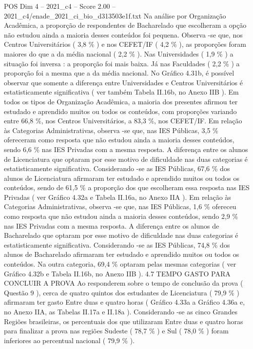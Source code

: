 \begin{textsample}{POS Dim 4 – 2021\_c4 – Score 2.00 – 2021\_c4/enade\_2021\_ci\_bio\_d313503e1f.txt}
Na análise por Organização Acadêmica, a proporção de respondentes de Bacharelado que escolheram a opção não estudou ainda a maioria desses conteúdos foi pequena.
Observa -se que, nos Centros Universitários ( 3,8 \% ) e nos CEFET/IF ( 4,2 \% ), as proporções foram maiores do que a da média nacional ( 2,2 \% ).
Nas Universidades ( 1,9 \% ) a situação foi inversa : a proporção foi mais baixa.
Já nas Faculdades ( 2,2 \% ) a proporção foi a mesma que a da média nacional.
No Gráfico 4.31b, é possível observar que somente a diferença entre Universidades e Centros Universitários é estatisticamente significativa ( ver também Tabela II.16b, no Anexo IIB ).
Em todos os tipos de Organização Acadêmica, a maioria dos presentes afirmou ter estudado e aprendido muitos ou todos os conteúdos, com proporções variando entre 66,8 \%, nos Centros Universitários, a 83,3 \%, nos CEFET/IF.
Em relação às Categorias Administrativas, observa -se que, nas IES Públicas, 3,5 \% ofereceram como resposta que não estudou ainda a maioria desses conteúdos, sendo 6,6 \% nas IES Privadas com a mesma resposta.
A diferença entre os alunos de Licenciatura que optaram por esse motivo de dificuldade nas duas categorias é estatisticamente significativa.
Considerando -se as IES Públicas, 67,6 \% dos alunos de Licenciatura afirmaram ter estudado e aprendido muitos ou todos os conteúdos, sendo de 61,5 \% a proporção dos que escolheram essa resposta nas IES Privadas ( ver Gráfico 4.32a e Tabela II.16a, no Anexo IIA ).
Em relação às Categorias Administrativas, observa -se que, nas IES Públicas, 1,6 \% ofereceu como resposta que não estudou ainda a maioria desses conteúdos, sendo 2,9 \% nas IES Privadas com a mesma resposta.
A diferença entre os alunos de Bacharelado que optaram por esse motivo de dificuldade nas duas categorias é estatisticamente significativa.
Considerando -se as IES Públicas, 74,8 \% dos alunos de Bacharelado afirmaram ter estudado e aprendido muitos ou todos os conteúdos.
Na outra categoria, 69,4 \% optaram pelas mesmas categorias ( ver Gráfico 4.32b e Tabela II.16b, no Anexo IIB ). 4.7 TEMPO GASTO PARA CONCLUIR A PROVA Ao responderem sobre o tempo de conclusão da prova ( Questão 9 ), cerca de quatro quintos dos estudantes de Licenciatura ( 79,9 \% ) afirmaram ter gasto Entre duas e quatro horas ( Gráfico 4.33a a Gráfico 4.36a e, no Anexo IIA, as Tabelas II.17a e II.18a ).
Considerando -se as cinco Grandes Regiões brasileiras, os percentuais dos que utilizaram Entre duas e quatro horas para finalizar a prova nas regiões Sudeste ( 78,7 \% ) e Sul ( 78,0 \% ) foram inferiores ao percentual nacional ( 79,9 \% ).

\end{textsample}
